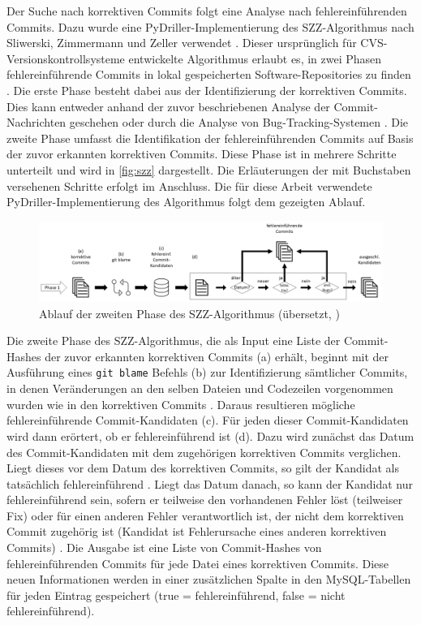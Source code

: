 \label{szz-def}
Der Suche nach korrektiven Commits folgt eine Analyse nach fehlereinführenden Commits. Dazu wurde eine PyDriller-Implementierung des SZZ-Algorithmus nach Sliwerski, Zimmermann und Zeller verwendet \cite{Sliwerski2005}. Dieser ursprünglich für CVS-Versionskontrollsysteme entwickelte Algorithmus erlaubt es, in zwei Phasen fehlereinführende Commits in lokal gespeicherten Software-Repositories zu finden \cite{Borg2019}. Die erste Phase besteht dabei aus der Identifizierung der korrektiven Commits. Dies kann entweder anhand der zuvor beschriebenen Analyse der Commit-Nachrichten geschehen oder durch die Analyse von Bug-Tracking-Systemen \cite{Borg2019}. Die zweite Phase umfasst die Identifikation der fehlereinführenden Commits auf Basis der zuvor erkannten korrektiven Commits. Diese Phase ist in mehrere Schritte unterteilt und wird in \autoref{fig:szz} dargestellt. Die Erläuterungen der mit Buchstaben versehenen Schritte erfolgt im Anschluss. Die für diese Arbeit verwendete PyDriller-Implementierung des Algorithmus folgt dem gezeigten Ablauf.

\begin{figure}[H]
    \centering
    \includegraphics[width=\textwidth]{images/SZZ}
    \caption{Ablauf der zweiten Phase des SZZ-Algorithmus (übersetzt, \cite{Borg2019})\label{fig:szz}}
\end{figure}

Die zweite Phase des SZZ-Algorithmus, die als Input eine Liste der Commit-Hashes der zuvor erkannten korrektiven Commits (a) erhält, beginnt mit der Ausführung eines \texttt{git blame} Befehls (b) zur Identifizierung sämtlicher Commits, in denen Veränderungen an den selben Dateien und Codezeilen vorgenommen wurden wie in den korrektiven Commits \cite{Borg2019}. Daraus resultieren mögliche fehlereinführende Commit-Kandidaten (c). Für jeden dieser Commit-Kandidaten wird dann erörtert, ob er fehlereinführend ist (d). Dazu wird zunächst das Datum des Commit-Kandidaten mit dem zugehörigen korrektiven Commits verglichen. Liegt dieses vor dem Datum des korrektiven Commits, so gilt der Kandidat als tatsächlich fehlereinführend \cite{Borg2019}. Liegt das Datum danach, so kann der Kandidat nur fehlereinführend sein, sofern er teilweise den vorhandenen Fehler löst (teilweiser Fix) oder für einen anderen Fehler verantwortlich ist, der nicht dem korrektiven Commit zugehörig ist (Kandidat ist Fehlerursache eines anderen korrektiven Commits) \cite{Borg2019}. Die Ausgabe ist eine Liste von Commit-Hashes von fehlereinführenden Commits für jede Datei eines korrektiven Commits. Diese neuen Informationen werden in einer zusätzlichen Spalte in den MySQL-Tabellen für jeden Eintrag gespeichert (true = fehlereinführend, false = nicht fehlereinführend). 

